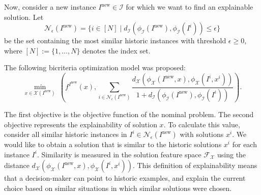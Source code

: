 \documentclass[11pt, a4paper]{article}
\newcommand{\AMil}[1]{\todo[color=green!50!black, textcolor=white, inline, author=AM]{#1}}
\newcommand{\I}{{\mathcal{I}}} %
\newcommand{\X}{{\mathcal{X}}} %
\newcommand{\F}{{\mathcal{F}}} %
\newcommand{\solfeaturespace}{\F_\X} %
\newcommand{\instance}{I}
\newcommand{\solution}{x}
\newcommand{\instanceindex}{i}
\newcommand{\instanceindextwo}{j}
\newcommand{\instfeaturemap}[1][(\instance^\instanceindex)]{\phi_\I#1} %
\newcommand{\solfeaturemap}[1][(\instance^\instanceindex,\solution^\instanceindex)]{\phi_\X#1} %
\newcommand{\fsel}{S} %
\newcommand{\selectionset}{\fsel}
\newcommand{\x}{{x}}
\newcommand{\soldist}[1][(\instanceindex,\instanceindextwo)]{d_\X#1} %
\newcommand{\neighbour}{\ensuremath{\mathcal{N}}}
\newcommand{\sEps}[1][(\instanceindex,\selectionset)]{\ensuremath{\neighbour_\epsilon#1}}
\newcommand{\Inew}{I^\text{new}}
\begin{document}
Now, consider a new instance $\Inew \in \I$ for which we want to find an explainable solution.
Let
\begin{equation}
	\sEps[(\Inew)]=\{i \in [N] \mid d_\I(\instfeaturemap[](\Inew),\instfeaturemap[](I^i)) \leq \epsilon\}
	\label{s_eps}
	\tag{Sim-Set}
\end{equation} 
be the set containing the most similar historic instances with threshold $\epsilon\geq 0$, where $[N]:=\{1,\ldots,N\}$ denotes the index set.%

The following bicriteria optimization model was proposed:
\begin{equation}
	\min_{x \in \X(\Inew)} \ \left( f^{\Inew}(x), \sum_{i \in \sEps[(\Inew)]}\frac{d_{\X}\left( \solfeaturemap[](\Inew,\x),\solfeaturemap[](I^i,\x^i)\right)}{1+ d_\I\left(\instfeaturemap[](\Inew),\instfeaturemap\right)}
	\right). \tag{Exp}\label{exp_formula}
\end{equation}


The first objective is the objective function of the nominal problem.
The second objective represents the explainability of solution $x$.
To calculate this value, consider all similar historic instances in $I^i \in \sEps[](\Inew)$ with solutions $x^i$.
We would like to obtain a solution that is similar to the historic solutions $x^i$ for each  instance $I^i$.
Similarity is measured in the solution feature space $\solfeaturespace$ using the distance $\soldist[(\solfeaturemap[(\Inew,\solution)],\solfeaturemap[(I^i,\solution^i)])]$.
This definition of explainability means that a decision-maker can point to historic examples, and explain the current choice based on similar situations in which similar solutions were chosen.
\end{document}
